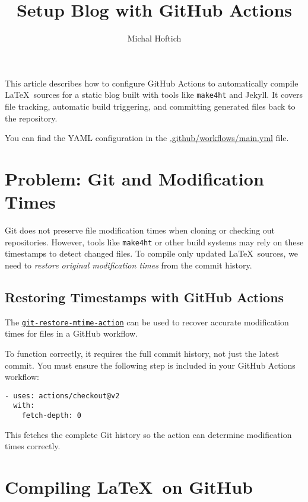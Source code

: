 \documentclass{article}
\title{Setup Blog with GitHub Actions}
\author{Michal Hoftich}
\def\makeht{\texttt{make4ht}}
\begin{document}
\maketitle

This article describes how to configure GitHub Actions to automatically compile \LaTeX\ sources
for a static blog built with tools like \makeht{} and Jekyll. It covers file tracking,
automatic build triggering, and committing generated files back to the repository.

You can find the YAML configuration in the
\href{https://github.com/michal-h21/testblog/blob/main/.github/workflows/main.yml}{.github/workflows/main.yml}
file.


\tableofcontents

\section{Problem: Git and Modification Times}

Git does not preserve file modification times when cloning or checking out repositories.  
However, tools like \makeht{} or other build systems may rely on these timestamps to detect changed files.  
To compile only updated \LaTeX\ sources, we need to \textit{restore original modification times}
from the commit history.

\subsection{Restoring Timestamps with GitHub Actions}

The \href{https://github.com/chetan/git-restore-mtime-action}{\texttt{git-restore-mtime-action}} 
can be used to recover accurate modification times for files in a GitHub workflow.

To function correctly, it requires the full commit history, not just the latest commit.
You must ensure the following step is included in your GitHub Actions workflow:

\begin{verbatim}
- uses: actions/checkout@v2
  with:
    fetch-depth: 0
\end{verbatim}

This fetches the complete Git history so the action can determine modification times correctly.

\section{Compiling \LaTeX\ on GitHub}
\end{document}
